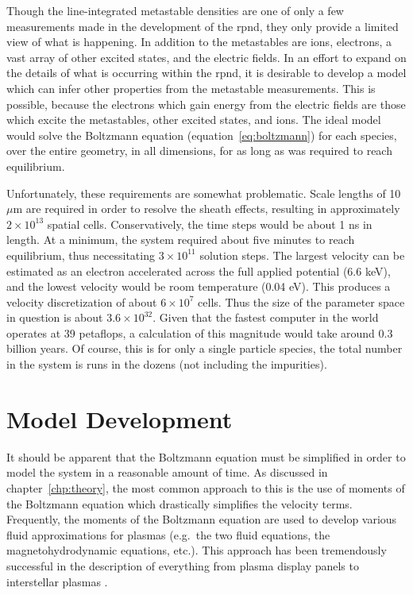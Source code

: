 Though the line-integrated metastable densities are one of only a few
measurements made in the development of the \acs{rpnd}, they only provide a
limited view of what is happening. In addition to the metastables are ions,
electrons, a vast array of other excited states, and the electric fields. In an
effort to expand on the details of what is occurring within the \acs{rpnd}, it
is desirable to develop a model which can infer other properties from the
metastable measurements. This is possible, because the electrons which gain
energy from the electric fields are those which excite the metastables, other
excited states, and ions. The ideal model would solve the Boltzmann equation
(equation~\ref{eq:boltzmann}) for each species, over the entire geometry, in all
dimensions, for as long as was required to reach equilibrium.

Unfortunately, these requirements are somewhat problematic. Scale lengths of 10
$\mu$m are required in order to resolve the sheath effects, resulting in
approximately $2\times10^{13}$ spatial cells. Conservatively, the time steps
would be about 1 ns in length. At a minimum, the system required about five
minutes to reach equilibrium, thus necessitating $3\times10^{11}$ solution
steps. The largest velocity can be estimated as an electron accelerated across
the full applied potential (6.6 keV), and the lowest velocity would be room
temperature (0.04 eV). This produces a velocity discretization of about
$6\times10^7$ cells. Thus the size of the parameter space in question is about
$3.6\times10^{32}$. Given that the fastest computer in the world operates at 39
petaflops, a calculation of this magnitude would take around 0.3 billion years.
Of course, this is for only a single particle species, the total number in the
system is runs in the dozens (not including the impurities).

\section{Model Development}

It should be apparent that the Boltzmann equation must be simplified in order to
model the system in a reasonable amount of time. As discussed in
chapter~\ref{chp:theory}, the most common approach to this is the use of moments
of the Boltzmann equation which drastically simplifies the velocity terms.
Frequently, the moments of the Boltzmann equation are used to develop various
fluid approximations for plasmas \cite{Chen1984} (e.g.\ the two fluid equations,
the magnetohydrodynamic equations, etc.). This approach has been tremendously
successful in the description of everything from plasma display panels
\cite{Rauf1999b} to interstellar plasmas \cite{Linde1998}.

